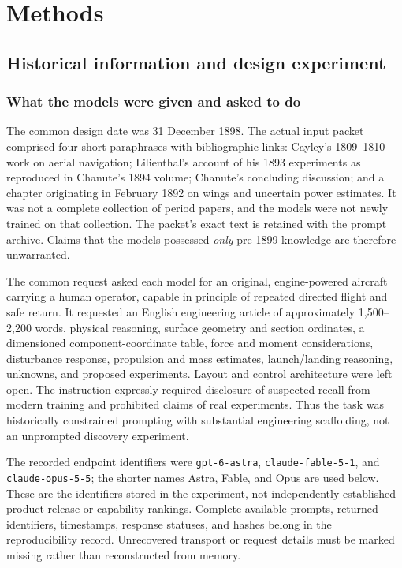 \documentclass[10pt,letterpaper]{article}
\begin{document}
\section{Methods}
\subsection{Historical information and design experiment}
\subsubsection{What the models were given and asked to do}
The common design date was 31 December 1898. The actual input packet comprised four short paraphrases with bibliographic links: Cayley's 1809--1810 work on aerial navigation; Lilienthal's account of his 1893 experiments as reproduced in Chanute's 1894 volume; Chanute's concluding discussion; and a chapter originating in February 1892 on wings and uncertain power estimates. It was not a complete collection of period papers, and the models were not newly trained on that collection. The packet's exact text is retained with the prompt archive. Claims that the models possessed \emph{only} pre-1899 knowledge are therefore unwarranted.

The common request asked each model for an original, engine-powered aircraft carrying a human operator, capable in principle of repeated directed flight and safe return. It requested an English engineering article of approximately 1,500--2,200 words, physical reasoning, surface geometry and section ordinates, a dimensioned component-coordinate table, force and moment considerations, disturbance response, propulsion and mass estimates, launch/landing reasoning, unknowns, and proposed experiments. Layout and control architecture were left open. The instruction expressly required disclosure of suspected recall from modern training and prohibited claims of real experiments. Thus the task was historically constrained prompting with substantial engineering scaffolding, not an unprompted discovery experiment.

The recorded endpoint identifiers were \texttt{gpt-6-astra}, \texttt{claude-fable-5-1}, and \texttt{claude-opus-5-5}; the shorter names Astra, Fable, and Opus are used below. These are the identifiers stored in the experiment, not independently established product-release or capability rankings. Complete available prompts, returned identifiers, timestamps, response statuses, and hashes belong in the reproducibility record. Unrecovered transport or request details must be marked missing rather than reconstructed from memory.
\end{document}
